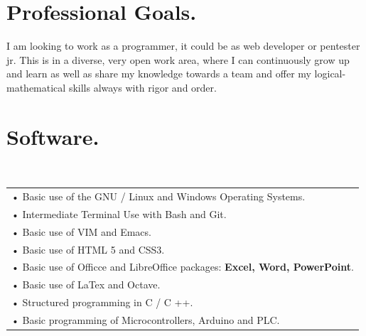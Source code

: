 \documentclass[]{friggeri-cv}
\begin{document}
\begin{table}[h]
    \centering
        \section{Professional Goals.}
\end{table}

I am looking to work as a programmer, it could be as web developer or pentester jr. This is in a diverse, very open work area, where I can continuously grow up and learn as well as share my knowledge towards a team and offer my logical-mathematical skills always with rigor and order.

\begin{table}[h]
    \centering
    \section{Software.}
\\
    \begin{tabular}{l}

• Basic use of the GNU / Linux and Windows Operating Systems. \\
• Intermediate Terminal Use with Bash and Git. \\
• Basic use of VIM and Emacs. \\
• Basic use of HTML 5 and CSS3. \\
• Basic use of Officce and LibreOffice packages: \textbf{Excel, Word, PowerPoint}. \\
• Basic use of LaTex and Octave. \\
• Structured programming in C / C ++. \\
• Basic programming of Microcontrollers, Arduino and PLC. \\
    \end{tabular}
    \label{tab:my_label}
\end{table}
    \centering

    \newpage
\end{document}
